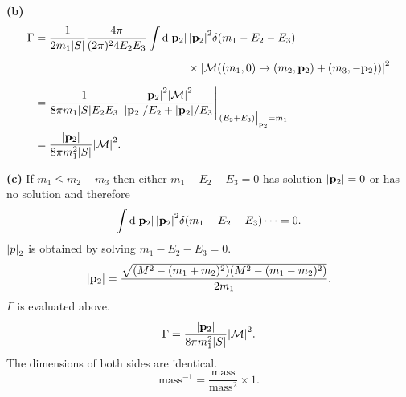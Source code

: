\documentclass{article}
\makeatletter
\newcommand*{\shifttext}[1]{%
  \settowidth{\@tempdima}{#1}%
  \hspace{-\@tempdima}#1%
}
\newcommand{\plabel}[1]{%
\shifttext{\textbf{#1}\quad}%
}
\newcommand{\prule}{%
\begin{center}%
\hdashrule[0.5ex]{.99\linewidth}{1pt}{1pt 2.5pt}%
\end{center}%
}
\newcommand{\minusbaseline}{\abovedisplayskip=0pt\abovedisplayshortskip=0pt~\vspace*{-\baselineskip}}%
\makeatother
\begin{document}
\plabel{(b)}%
\begingroup\minusbaseline
\begin{align*}
    \Gamma &= \frac{1}{2m_1\abs{S}} \frac{4\pi}{(2\pi)^2 4E_2 E_3} \int \dd{\abs{\vb{p}_2}} \abs{\vb{p}_2}^2 \delta(m_1 - E_2 - E_3) \\
    &{\phantom{{}=\frac{1}{2m_1\abs{S}} \frac{1}{(2\pi)^2 4E_2 E_3} \int \dd{\abs{\vb{p}_2}} }} {} \times \abs{\mathcal{M}((m_1,0) \rightarrow (m_2,\vb{p}_2) + (m_3,-\vb{p}_2))}^2 \\
    &= \frac{1}{8\pi m_1 \abs{S} E_2 E_3} \eval{\frac{\abs{\vb{p}_2}^2 \abs{\mathcal{M}}^2}{\abs{\vb{p}_2}/E_2 + \abs{\vb{p}_2}/E_3}}_{\eval{(E_2+E_3)}_{\vb{p}_2} = m_1} \\
    &= \frac{\abs{\vb{p}_2}}{8\pi m_1^2 \abs{S}} \abs{\mathcal{M}}^2.
\end{align*}
\endgroup

\plabel{(c)}%
If $m_1 \le m_2 + m_3$ then either $m_1 - E_2 - E_3 = 0$ has solution $\abs{\vb{p}_2} = 0$ or has no solution and therefore
\[ \int \dd{\abs{\vb{p}_2}} \abs{\vb{p}_2}^2 \delta(m_1 - E_2 - E_3) \cdots = 0. \]
$\abs{p}_2$ is obtained by solving $m_1 - E_2 - E_3 = 0$.
\[ \abs{\vb{p}_2} = \frac{\sqrt{(M^2 - (m_1+m_2)^2)(M^2 - (m_1 - m_2)^2)}}{2m_1}. \]
$\Gamma$ is evaluated above.
\[ \Gamma = \frac{\abs{\vb{p}_2}}{8\pi m_1^2 \abs{S}} \abs{\mathcal{M}}^2. \]
The dimensions of both sides are identical.
\[ \mathrm{mass}^{-1} = \frac{\mathrm{mass}}{\mathrm{mass}^{2}} \times 1. \]

\prule
\end{document}
